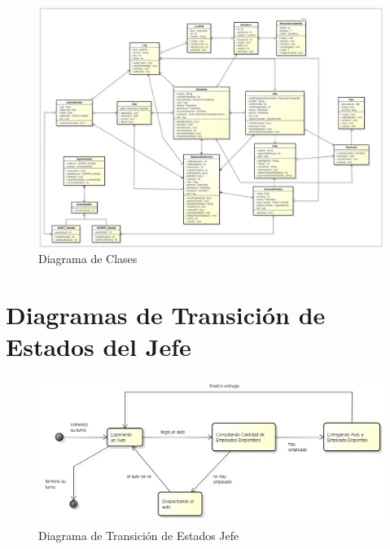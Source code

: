 \documentclass[a4paper,12pt]{article}
\begin{document}
\begin{figure}[h!]
\centering
\includegraphics[scale=0.33, angle=90]{Diagramas/clases.jpg} 
\caption{Diagrama de Clases}
\end{figure}

\newpage
\section{Diagramas de Transición de Estados del Jefe}

\begin{figure}[h!]
\centering
\includegraphics[scale=0.5]{Diagramas/DiagramaDeEstadosJefe.png} 
\caption{Diagrama de Transición de Estados Jefe}
\label{fig:DiagramaDeEstadosJefe}
\end{figure}	
\end{document}
